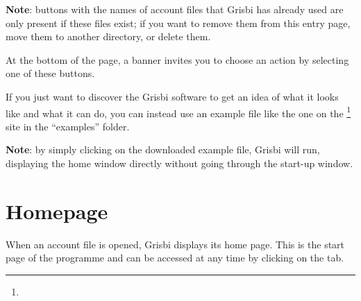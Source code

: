 
\textbf{Note}: buttons with the names of account files that Grisbi has already used are only present if these files exist; if you want to remove them from this entry page, move them to another directory, or delete them.%


At the bottom of the page, a banner invites you to choose an action by selecting one of these buttons.%


If you just want to discover the Grisbi software to get an idea of what it looks like and what it can do, you can instead use an example file like the one on the \footnote{\urlSourceForgeDocumentation{}} site in the \enquote{\textsf{examples}} folder.%


\textbf{Note}: by simply clicking on the downloaded example file, Grisbi will run, displaying the home window directly without going through the start-up window.%


\section{Homepage\label{home}}


When an account file is opened, Grisbi displays its home page.%
This is the start page of the programme and can be accessed at any time by clicking on the  tab.%

